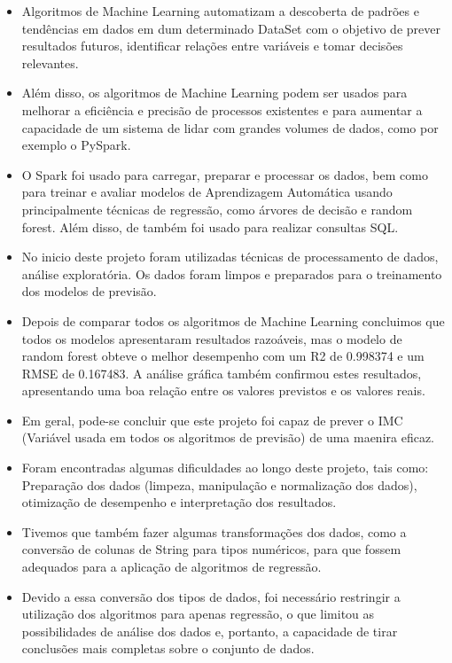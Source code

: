 \documentclass[11pt]{article}
\providecommand{\tightlist}{%
      \setlength{\itemsep}{0pt}\setlength{\parskip}{0pt}}
\begin{document}
    \begin{itemize}
\tightlist
\item Algoritmos de Machine Learning automatizam a descoberta de padrões e tendências em dados em dum determinado DataSet com o objetivo de prever resultados futuros, identificar relações entre variáveis e tomar decisões relevantes.
\item Além disso, os algoritmos de Machine Learning podem ser usados para melhorar a eficiência e precisão de processos existentes e para aumentar a capacidade de um sistema de lidar com grandes volumes de dados, como por exemplo o PySpark.
\item O Spark foi usado para carregar, preparar e processar os dados, bem como para treinar e avaliar modelos de Aprendizagem Automática usando principalmente técnicas de regressão, como árvores de decisão e random forest. Além disso, de também foi usado para realizar consultas SQL.
\item No inicio deste projeto foram utilizadas técnicas de processamento de dados, análise exploratória. Os dados foram limpos e preparados para o treinamento dos modelos de previsão.
\item Depois de comparar todos os algoritmos de Machine Learning concluimos que todos os modelos apresentaram resultados razoáveis, mas o modelo de random forest obteve o melhor desempenho com um R2 de 0.998374 e um RMSE de 0.167483. A análise gráfica também confirmou estes resultados, apresentando uma boa relação entre os valores previstos e os valores reais. 
\item Em geral, pode-se concluir que este projeto foi capaz de prever o IMC (Variável usada em todos os algoritmos de previsão) de uma maenira eficaz.
\item Foram encontradas algumas dificuldades ao longo deste projeto, tais como: Preparação dos dados (limpeza, manipulação e normalização dos dados), otimização de desempenho e interpretação dos resultados.
\item Tivemos que também fazer algumas transformações dos dados, como a conversão de colunas de String para tipos numéricos, para que fossem adequados para a aplicação de algoritmos de regressão.
\item Devido a essa conversão dos tipos de dados, foi necessário restringir a utilização dos algoritmos para apenas regressão, o que limitou as possibilidades de análise dos dados e, portanto, a capacidade de tirar conclusões mais completas sobre o conjunto de dados.
\end{itemize}
\end{document}
